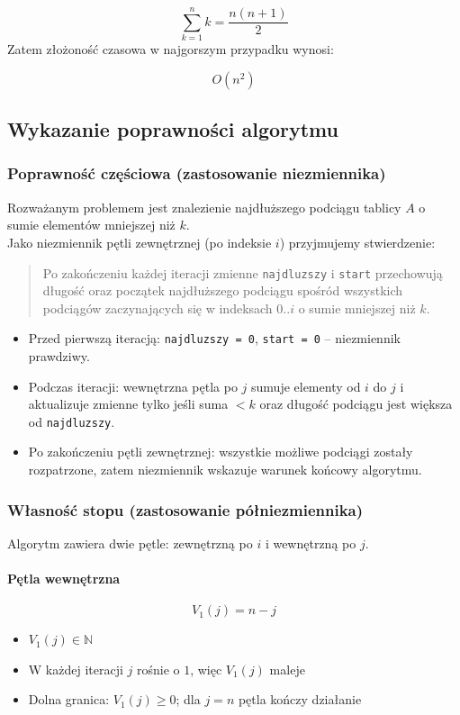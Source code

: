 \documentclass{article}
\begin{document}
{ \Large
\begin{equation}
    \sum_{k=1}^{n}k = \frac{n(n+1)}{2}
\end{equation}
}
Zatem złożoność czasowa w najgorszym przypadku wynosi:

\begin{equation}
    O(n^2)
\end{equation}

\subsection{Wykazanie poprawności algorytmu}
\subsubsection{Poprawność częściowa (zastosowanie niezmiennika)} 
Rozważanym problemem jest znalezienie najdłuższego podciągu tablicy $A$ o sumie elementów mniejszej niż $k$. \\

Jako niezmiennik pętli zewnętrznej (po indeksie $i$) przyjmujemy stwierdzenie:
\begin{quote}
Po zakończeniu każdej iteracji zmienne \texttt{najdluzszy} i \texttt{start} przechowują długość oraz początek najdłuższego podciągu spośród wszystkich podciągów zaczynających się w indeksach $0..i$ o sumie mniejszej niż $k$.
\end{quote}

\begin{itemize}
    \item Przed pierwszą iteracją: \texttt{najdluzszy = 0}, \texttt{start = 0} – niezmiennik prawdziwy.
    \item Podczas iteracji: wewnętrzna pętla po $j$ sumuje elementy od $i$ do $j$ i aktualizuje zmienne tylko jeśli suma $< k$ oraz długość podciągu jest większa od \texttt{najdluzszy}.
    \item Po zakończeniu pętli zewnętrznej: wszystkie możliwe podciągi zostały rozpatrzone, zatem niezmiennik wskazuje warunek końcowy algorytmu.
\end{itemize}

\subsubsection{Własność stopu (zastosowanie półniezmiennika)}
Algorytm zawiera dwie pętle: zewnętrzną po $i$ i wewnętrzną po $j$.

\paragraph{Pętla wewnętrzna}
\[
V_1(j) = n - j
\]
\begin{itemize}
    \item $V_1(j) \in \mathbb{N}$
    \item W każdej iteracji $j$ rośnie o $1$, więc $V_1(j)$ maleje
    \item Dolna granica: $V_1(j) \ge 0$; dla $j = n$ pętla kończy działanie
\end{itemize}
\end{document}
